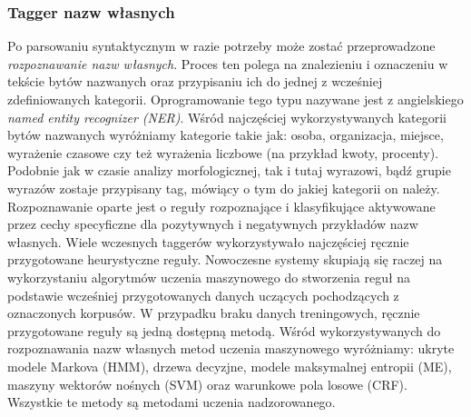 \documentclass[a4paper, twoside, 12pt]{report}
\begin{document}
            \subsubsection{Tagger nazw własnych}
                Po parsowaniu syntaktycznym w razie potrzeby może zostać przeprowadzone \emph{rozpoznawanie nazw własnych}. Proces
                ten polega na znalezieniu i oznaczeniu w tekście bytów nazwanych oraz przypisaniu ich do jednej z wcześniej
                zdefiniowanych kategorii. Oprogramowanie tego typu nazywane jest z angielskiego \emph{named entity recognizer (NER)}.
                Wśród najczęściej wykorzystywanych kategorii bytów nazwanych wyróżniamy kategorie
                takie jak: osoba, organizacja, miejsce, wyrażenie czasowe czy też wyrażenia liczbowe (na przykład kwoty, procenty).
                Podobnie jak w czasie analizy morfologicznej, tak i tutaj wyrazowi, bądź grupie wyrazów zostaje przypisany
                tag, mówiący o tym do jakiej kategorii on należy. Rozpoznawanie oparte jest o reguły rozpoznające i klasyfikujące
                aktywowane przez cechy specyficzne dla pozytywnych i negatywnych przykładów nazw własnych. Wiele wczesnych
                taggerów wykorzystywało najczęściej ręcznie przygotowane heurystyczne reguły. Nowoczesne systemy skupiają się
                raczej na wykorzystaniu algorytmów uczenia maszynowego do stworzenia reguł na podstawie wcześniej przygotowanych
                danych uczących pochodzących z oznaczonych korpusów. W przypadku braku danych treningowych, ręcznie przygotowane
                reguły są jedną dostępną metodą. Wśród wykorzystywanych do rozpoznawania nazw własnych metod uczenia maszynowego
                wyróżniamy: ukryte modele Markova (HMM), drzewa decyzjne, modele maksymalnej entropii (ME), maszyny wektorów nośnych (SVM)
                oraz warunkowe pola losowe (CRF). Wszystkie te metody są metodami uczenia nadzorowanego\cite{NERSURVEY}.
\end{document}
